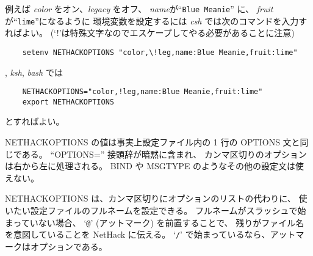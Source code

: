 例えば {\it color\/} をオン、{\it legacy\/} をオフ、
{\it name\/}が``{\tt Blue Meanie}'' に、
{\it fruit\/}が``{\tt lime}''になるように
環境変数を設定するには {\it csh} では次のコマンドを入力すればよい。
(`!'は特殊文字なのでエスケープしてやる必要があることに注意)
\begin{verbatim}
    setenv NETHACKOPTIONS "color,\!leg,name:Blue Meanie,fruit:lime"
\end{verbatim}

, {\it ksh}, {\it bash} では
\begin{verbatim}
    NETHACKOPTIONS="color,!leg,name:Blue Meanie,fruit:lime"
    export NETHACKOPTIONS
\end{verbatim}

とすればよい。

NETHACKOPTIONS の値は事実上設定ファイル内の
1 行の OPTIONS 文と同じである。
``OPTIONS='' 接頭辞が暗黙に含まれ、
カンマ区切りのオプションは右から左に処理される。
BIND や MSGTYPE のようなその他の設定文は使えない。

NETHACKOPTIONS は、カンマ区切りにオプションのリストの代わりに、
使いたい設定ファイルのフルネームを設定できる。
フルネームがスラッシュで始まっていない場合、
`{\tt @}' (アットマーク) を前置することで、
残りがファイル名を意図していることを NetHack に伝える。
`{\tt /}' で始まっているなら、アットマークはオプションである。


